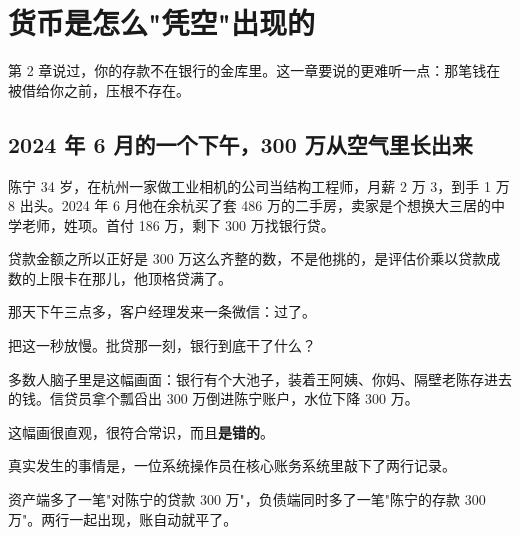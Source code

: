 \chapter{货币是怎么"凭空"出现的}

\begin{ledetext}
第 2 章说过，你的存款不在银行的金库里。这一章要说的更难听一点：那笔钱在被借给你之前，压根不存在。
\end{ledetext}

\section{2024 年 6 月的一个下午，300 万从空气里长出来}

陈宁 34 岁，在杭州一家做工业相机的公司当结构工程师，月薪 2 万 3，到手 1 万 8 出头。2024 年 6 月他在余杭买了套 486 万的二手房，卖家是个想换大三居的中学老师，姓项。首付 186 万，剩下 300 万找银行贷。

贷款金额之所以正好是 300 万这么齐整的数，不是他挑的，是评估价乘以贷款成数的上限卡在那儿，他顶格贷满了。

那天下午三点多，客户经理发来一条微信：过了。

把这一秒放慢。批贷那一刻，银行到底干了什么？

多数人脑子里是这幅画面：银行有个大池子，装着王阿姨、你妈、隔壁老陈存进去的钱。信贷员拿个瓢舀出 300 万倒进陈宁账户，水位下降 300 万。

这幅画很直观，很符合常识，而且\textbf{是错的}。

真实发生的事情是，一位系统操作员在核心账务系统里敲下了两行记录。

\begin{bsheet}
\end{bsheet}

\begin{bsheet}
\end{bsheet}

资产端多了一笔"对陈宁的贷款 300 万"，负债端同时多了一笔"陈宁的存款 300 万"。两行一起出现，账自动就平了。

